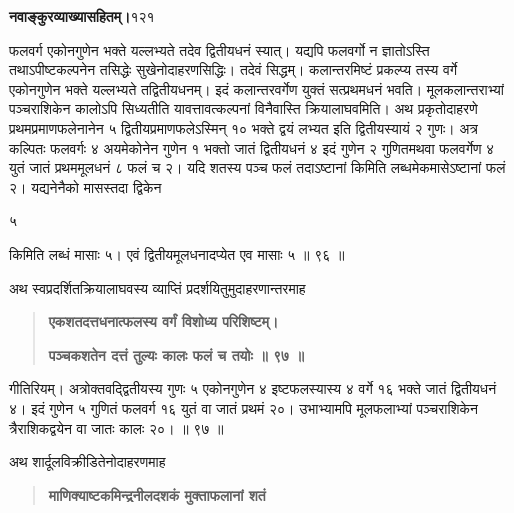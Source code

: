 \documentclass[11pt, openany]{book}
\begin{document}
\onehalfspacing
\hspace{2in}\textbf{नवाङ्कुरव्याख्यासहितम्।}\hspace{2in}१२१

\vspace{5mm}

\begin{sloppypar}
\hangindent=0.2in फलवर्ग एकोनगुणेन भक्ते यल्लभ्यते तदेव द्वितीयधनं स्यात्। यद्यपि फलवर्गो न ज्ञातोऽस्ति तथाऽपीष्टकल्पनेन तसिद्धेः सुखेनोदाहरणसिद्धिः। तदेवं सिद्धम्। कलान्तरमिष्टं प्रकल्प्य तस्य वर्गे एकोनगुणेन भक्ते यल्लभ्यते तद्वितीयधनम्। इदं कलान्तरवर्गेण युक्तं सत्प्रथमधनं भवति। मूलकलान्तराभ्यां पञ्चराशिकेन कालोऽपि सिध्यतीति यावत्तावत्कल्पनां विनैवास्ति क्रियालाघवमिति। अथ प्रकृतोदाहरणे प्रथमप्रमाणफलेनानेन ५ द्वितीयप्रमाणफलेऽस्मिन् १० भक्ते द्वयं लभ्यत इति द्वितीयस्यायं २ गुणः। अत्र कल्पितः फलवर्गः ४ अयमेकोनेन गुणेन १ भक्तो जातं द्वितीयधनं ४ इदं गुणेन २ गुणितमथवा फलवर्गेण ४ युतं जातं प्रथममूलधनं ८ फलं च २। यदि शतस्य पञ्च फलं तदाऽष्टानां किमिति लब्धमेकमासेऽष्टानां फलं २। यद्यनेनैको मासस्तदा द्विकेन 

\hspace{3in}५

\hangindent=0.2in किमिति लब्धं मासाः ५। एवं द्वितीयमूलधनादप्येत एव मासाः ५ ॥ ९६ ॥

\hangindent=0.2in \hspace{0.2in}अथ स्वप्रदर्शितक्रियालाघवस्य व्याप्तिं प्रदर्शयितुमुदाहरणान्तरमाह\textendash

\begin{quote}
\hspace{1in}\textbf{एकशतदत्तधनात्फलस्य वर्गं विशोध्य परिशिष्टम्।}

\hspace{1in}\textbf{पञ्चकशतेन दत्तं तुल्यः कालः फलं च तयोः ॥ ९७ ॥}
\end{quote}

\hangindent=0.2in \hspace{0.2in}गीतिरियम्। अत्रोक्तवद्द्वितीयस्य गुणः ५ एकोनगुणेन ४ इष्टफलस्यास्य ४ वर्गे १६ भक्ते जातं द्वितीयधनं ४। इदं गुणेन ५ गुणितं फलवर्ग १६ युतं वा जातं प्रथमं २०। उभाभ्यामपि मूलफलाभ्यां पञ्चराशिकेन त्रैराशिकद्वयेन वा जातः कालः २०। ॥ ९७ ॥

\hangindent=0.2in \hspace{0.2in}अथ शार्दूलविक्रीडितेनोदाहरणमाह\textendash

\begin{quote}
\hspace{1in}\textbf{माणिक्याष्टकमिन्द्रनीलदशकं मुक्ताफलानां शतं}


\end{quote}
\end{sloppypar}
\end{document}
